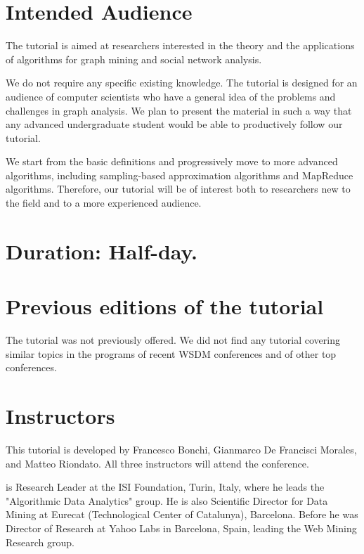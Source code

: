 \documentclass{sig-alternate}
\newcommand{\para}[1]{\noindent{\bf #1}}
\begin{document}
%

\section*{Intended Audience}
The tutorial is aimed at researchers interested in the theory and the
applications of algorithms for graph mining and social network analysis.

We do not require any specific existing knowledge. The tutorial is designed for
an audience of computer scientists who have a general idea of the problems and
challenges in graph analysis. We plan to present the material in such a way that
any advanced undergraduate student would be able to productively follow our
tutorial.

We start from the basic definitions and progressively move to more advanced
algorithms, including sampling-based approximation algorithms and MapReduce
algorithms. Therefore, our tutorial will be of interest both to researchers new
to the field and to a more experienced audience.

\section*{Duration: \textrm{Half-day.}}

\section*{Previous editions of the tutorial}
The tutorial was not previously offered. We did not find any tutorial covering
similar topics in the programs of recent WSDM conferences and of other top
conferences.

\section*{Instructors}
This tutorial is developed by Francesco Bonchi, Gianmarco De Francisci Morales,
and Matteo Riondato. All three instructors will attend the conference.

\para{Francesco Bonchi} is Research Leader at the ISI Foundation, Turin, Italy,
where he leads the "Algorithmic Data Analytics" group. He is also Scientific
Director for Data Mining at Eurecat (Technological Center of Catalunya),
Barcelona. Before he was Director of Research at Yahoo Labs in Barcelona, Spain,
leading the Web Mining Research group.
\end{document}
